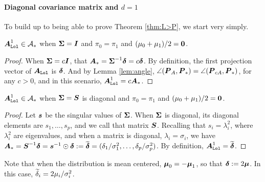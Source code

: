 \documentclass[10pt]{article}
\begin{document}

\paragraph{Diagonal covariance matrix and $d=1$}


To build up to being able to prove Theorem \ref{thm:L>P}, we start very simply.

\begin{lem}
$\boldsymbol{A}_{{\sc \texttt{Lol}}}^1 \in \mathcal{A}_*$ when $\boldsymbol{\Sigma}=\boldsymbol{I}$ and $\pi_0=\pi_1$ and $(\mu_0+\mu_1)/2=\boldsymbol{0}$.
\end{lem}
\begin{proof}
When $\boldsymbol{\Sigma}=c \boldsymbol{I}$, that $\boldsymbol{A}_* = \boldsymbol{\Sigma}^{-1} \boldsymbol{\delta} = c \boldsymbol{\delta}$.
By definition, the first projection vector of $\boldsymbol{A}_{{\sc \texttt{Lol}}}$ is $\boldsymbol{\delta}$.
And by Lemma \ref{lem:angle}, $\angle(\boldsymbol{P}_A,\boldsymbol{P}_*)=\angle(\boldsymbol{P}_{c A},\boldsymbol{P}_*)$, for any $c>0$, and in this scenario, $\boldsymbol{A}_{{\sc \texttt{Lol}}}^1=c \boldsymbol{A}_*$.
\end{proof}

\begin{lem} \label{lem:lol1}
$\boldsymbol{A}_{{\sc \texttt{Lol}}}^1 \in \mathcal{A}_*$ when $\boldsymbol{\Sigma}=\boldsymbol{S}$ is diagonal and $\pi_0=\pi_1$ and $(\mu_0+\mu_1)/2=\boldsymbol{0}$.
\end{lem}
\begin{proof}
Let $\boldsymbol{s}$ be the singular values of $\boldsymbol{\Sigma}$.  When $\boldsymbol{\Sigma}$ is diagonal, its diagonal elements are $s_1,\ldots,s_p$, and we call that matrix $\boldsymbol{S}$. 
Recalling that $s_i=\lambda_i^2$, where $\lambda_i^2$ are eigenvalues, and when a matrix is diagonal, $\lambda_i=\sigma_i$, we have  $\boldsymbol{A}_*=\boldsymbol{S}^{-1} \boldsymbol{\delta}=\boldsymbol{s}^{-1} \odot \boldsymbol{\delta}:=\widetilde{\boldsymbol{\delta}}=(\delta_1/\sigma_1^2,\ldots,\delta_p/\sigma_p^2)$.
By definition, $\boldsymbol{A}_{{\sc \texttt{Lol}}}^1=\widetilde{\boldsymbol{\delta}}$.
\end{proof}

Note that when the distribution is mean centered, $\boldsymbol{\mu}_0=-\boldsymbol{\mu}_1$, so that $\boldsymbol{\delta}:=2 \boldsymbol{\mu}$.  In this case, $\widetilde{\delta}_i=2\mu_i / \sigma_i^2$.
\end{document}

